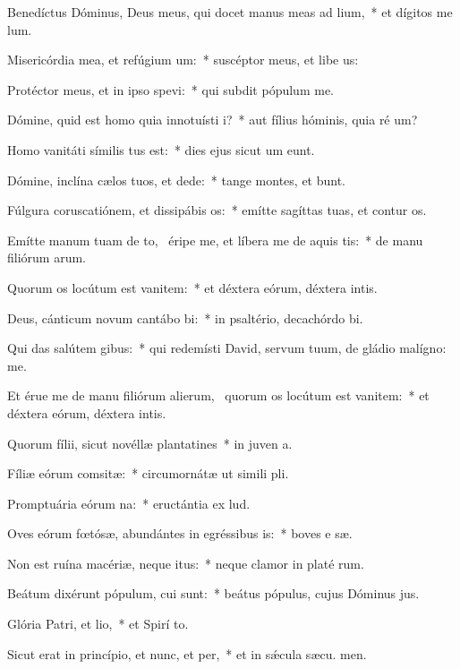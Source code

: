 \item Benedíctus Dóminus, Deus meus, qui docet manus meas ad lium,~* et dígitos me  lum.
\item Misericórdia mea, et refúgium um:~* suscéptor meus, et libe us:
\item Protéctor meus, et in ipso spevi:~* qui subdit pópulum   me.
\item Dómine, quid est homo quia innotuísti i?~* aut fílius hóminis, quia ré um?
\item Homo vanitáti símilis tus est:~* dies ejus sicut um eunt.
\item Dómine, inclína cælos tuos, et dede:~* tange montes, et bunt.
\item Fúlgura coruscatiónem, et dissipábis os:~* emítte sagíttas tuas, et contur os.
\item Emítte manum tuam de to,~\pscross{} éripe me, et líbera me de aquis tis:~* de manu filiórum arum.
\item Quorum os locútum est vanitem:~* et déxtera eórum, déxtera intis.
\item Deus, cánticum novum cantábo bi:~* in psaltério, decachórdo  bi.
\item Qui das salútem gibus:~* qui redemísti David, servum tuum, de gládio malígno:  me.
\item Et érue me de manu filiórum alierum,~\pscross{} quorum os locútum est vanitem:~* et déxtera eórum, déxtera intis.
\item Quorum fílii, sicut novéllæ plantatines~* in juven a.
\item Fíliæ eórum comsitæ:~* circumornátæ ut simili pli.
\item Promptuária eórum na:~* eructántia ex   lud.
\item Oves eórum fœtósæ, abundántes in egréssibus is:~* boves e sæ.
\item Non est ruína macériæ, neque itus:~* neque clamor in platé rum.
\item Beátum dixérunt pópulum, cui  sunt:~* beátus pópulus, cujus Dóminus  jus.
\item Glória Patri, et lio,~* et Spirí to.
\item Sicut erat in princípio, et nunc, et per,~* et in sǽcula sæcu. men.
